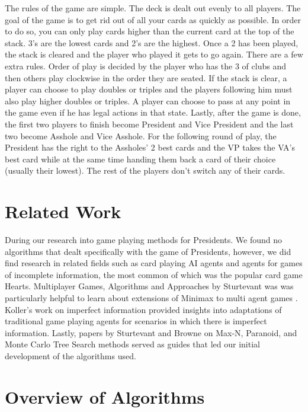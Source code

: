 \documentclass[11pt]{article}
\begin{document}
The rules of the game are simple. The deck is dealt out evenly to all players. The goal of the game is to get rid out of all your cards as quickly as possible. In order to do so, you can only play cards higher than the current card at the top of the stack. 3's are the lowest cards and 2's are the highest. Once a 2 has been played, the stack is cleared and the player who played it gets to go again. There are a few extra rules. Order of play is decided by the player who has the 3 of clubs and then others play clockwise in the order they are seated. If the stack is clear, a player can choose to play doubles or triples and the players following him must also play higher doubles or triples. A player can choose to pass at any point in the game even if he has legal actions in that state. Lastly, after the game is done, the first two players to finish become President and Vice President and the last two become Asshole and Vice Asshole. For the following round of play, the President has the right to the Assholes' 2 best cards and the VP takes the VA's best card while at the same time handing them back a card of their choice (usually their lowest). The rest of the players don't switch any of their cards.

\section{Related Work}

During our research into game playing methods for Presidents. We found no algorithms that dealt specifically with the game of Presidents, however, we did find research in related fields such as card playing AI agents and agents for games of incomplete information, the most common of which was the popular card game Hearts.  Multiplayer Games, Algorithms and Approaches by Sturtevant was was particularly helpful to learn about extensions of Minimax to multi agent games \cite{sturtevant03b}. Koller's work on imperfect information provided insights into adaptations of traditional game playing agents for scenarios in which there is imperfect information\cite{pfeffer95}. Lastly, papers by Sturtevant and Browne on Max-N, Paranoid, and Monte Carlo Tree Search methods served as guides that led our initial development of the algorithms used\cite{sturtevant03a, browne12}.



\section{Overview of Algorithms}
\end{document}
